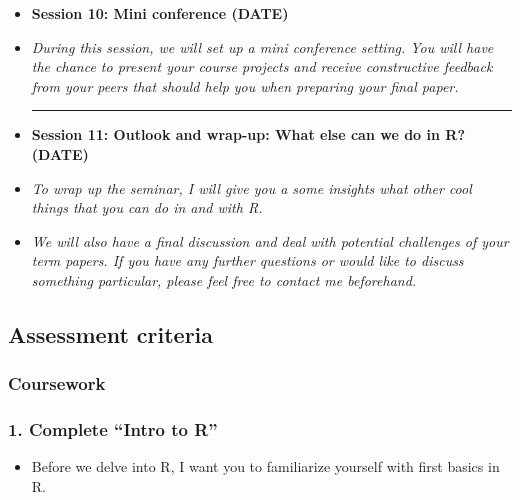 \documentclass[12pt, a4paper]{article}
\begin{document}
\begin{itemize}
\noindent\rule{16cm}{0.7pt}
\vspace*{-0.45in}
\item[] \textbf{Session 10: Mini conference  (DATE)} 
\item[]\textit{During this session, we will set up a mini conference setting. You will have the chance to present your course projects and receive constructive feedback from your peers that should help you when preparing your final paper.}

\vspace*{0.04in}
\noindent\rule{16cm}{0.7pt}
\vspace*{-0.45in}
\item[] \textbf{Session 11: Outlook and wrap-up: What else can we do in \textsf{R}? (DATE)} 
\item[]\textit{To wrap up the seminar, I will give you a some insights what other cool  things that you can do in and with \textsf{R}.}
\item[] \textit{We will also have a final discussion and deal with potential challenges of your term papers. If you have any further questions or would like to discuss something particular, please feel free to contact me beforehand.}
\end{itemize}

\newpage
\appendix

\subsection*{Assessment criteria}

\subsubsection*{Coursework}
\subsubsection*{1. Complete ``Intro to \textsf{R}''}
\begin{itemize}
\item[] Before we delve into \textsf{R}, I want you to familiarize yourself with first basics in \textsf{R}. 
\end{itemize}
\end{document}
